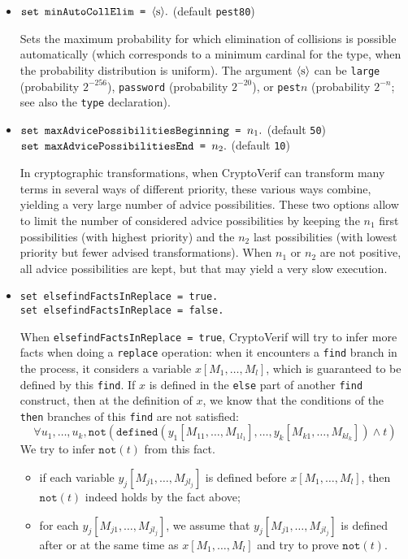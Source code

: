 \begin{itemize}
\begin{itemize}
\item $\texttt{set minAutoCollElim = }\langle\textrm{s}\rangle{\tt .}$ (default \texttt{pest80})

  Sets the maximum probability for which elimination of collisions is
  possible automatically (which corresponds to a minimum cardinal for
  the type, when the probability distribution is uniform).  The argument
  $\langle\textrm{s}\rangle$ can be \texttt{large} (probability $2^{-256}$),
  \texttt{password} (probability $2^{-20}$), or \texttt{pest}$n$
  (probability $2^{-n}$; see also the \texttt{type} declaration).

\item $\texttt{set maxAdvicePossibilitiesBeginning = }n_1{\tt .}$ (default \texttt{50})\\
$\texttt{set maxAdvicePossibilitiesEnd = }n_2{\tt .}$ (default \texttt{10})

In cryptographic transformations, when CryptoVerif can transform many terms in several ways of different priority, these various ways combine, yielding a very large number of advice possibilities. These two options allow to limit the number of considered advice possibilities by keeping the $n_1$ first possibilities (with highest priority) and the $n_2$ last possibilities (with lowest priority but fewer advised transformations). When $n_1$ or $n_2$ are not positive, all advice possibilities are kept, but that may yield a very slow execution. 

\item \texttt{set elsefindFactsInReplace = true.}\\
\texttt{set elsefindFactsInReplace = false.}

When \texttt{elsefindFactsInReplace = true}, CryptoVerif will try to
infer more facts when doing a \texttt{replace} operation: when it
encounters a \texttt{find} branch in the process, it considers a
variable $x[M_1, \ldots, M_l]$, which is guaranteed to be defined by this \texttt{find}.
If $x$ is defined in the \texttt{else} part of another \texttt{find}
construct, then at the definition of $x$, we know that the conditions
of the \texttt{then} branches of this \texttt{find} are not satisfied:
\[\forall u_1, \ldots, u_k, \texttt{not}(\texttt{defined}(y_1[M_{11}, \ldots, M_{1l_1}], \ldots, y_k[M_{k1}, \ldots, M_{kl_k}]) \wedge t)\]
We try to infer $\texttt{not}(t)$ from this fact.
\begin{itemize}
\item if each variable $y_j[M_{j1}, \ldots, M_{jl_j}]$ is defined before $x[M_1, \ldots, M_l]$,
then $\texttt{not}(t)$ indeed holds by the fact above;
\item for each $y_j[M_{j1}, \ldots, M_{jl_j}]$, 
we assume that $y_j[M_{j1}, \ldots, M_{jl_j}]$ is defined after or at the same time as $x[M_1, \ldots, M_l]$
and try to prove $\texttt{not}(t)$.


\end{itemize}
\end{itemize}
\end{itemize}
